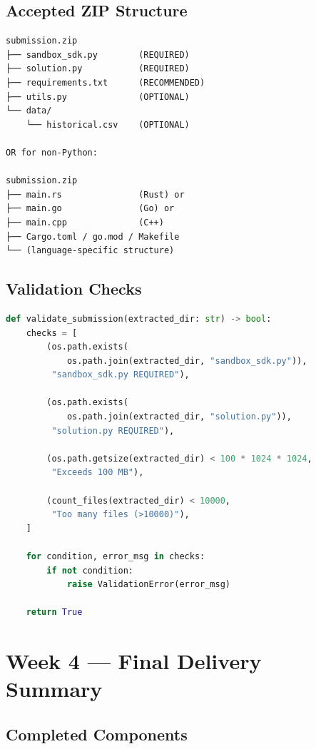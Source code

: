 \documentclass[10pt,a4paper,oneside]{report}
\begin{document}
\section{Accepted ZIP Structure}

\begin{lstlisting}
submission.zip
├── sandbox_sdk.py        (REQUIRED)
├── solution.py           (REQUIRED)
├── requirements.txt      (RECOMMENDED)
├── utils.py              (OPTIONAL)
└── data/
    └── historical.csv    (OPTIONAL)

OR for non-Python:

submission.zip
├── main.rs               (Rust) or
├── main.go               (Go) or
├── main.cpp              (C++)
├── Cargo.toml / go.mod / Makefile
└── (language-specific structure)
\end{lstlisting}

\section{Validation Checks}

\begin{lstlisting}[language=python]
def validate_submission(extracted_dir: str) -> bool:
    checks = [
        (os.path.exists(
            os.path.join(extracted_dir, "sandbox_sdk.py")),
         "sandbox_sdk.py REQUIRED"),

        (os.path.exists(
            os.path.join(extracted_dir, "solution.py")),
         "solution.py REQUIRED"),

        (os.path.getsize(extracted_dir) < 100 * 1024 * 1024,
         "Exceeds 100 MB"),

        (count_files(extracted_dir) < 10000,
         "Too many files (>10000)"),
    ]

    for condition, error_msg in checks:
        if not condition:
            raise ValidationError(error_msg)

    return True
\end{lstlisting}

\chapter{Week 4 — Final Delivery Summary}

\section{Completed Components}
\end{document}
